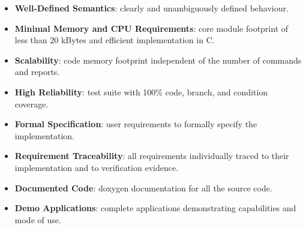 \begin{itemize}
\item{} \textbf{Well-{}Defined Semantics}: clearly and unambiguously defined behaviour.
\item{} \textbf{Minimal Memory and CPU Requirements}: core module footprint of less than 20 kBytes and efficient implementation in C.
\item{} \textbf{Scalability}: code memory footprint independent of the number of commands and reports.
\item{} \textbf{High Reliability}: test suite with 100\% code, branch, and condition coverage.
\item{} \textbf{Formal Specification}: user requirements to formally specify the implementation.
\item{} \textbf{Requirement Traceability}: all requirements individually traced to their implementation and to verification evidence.
\item{} \textbf{Documented Code}: doxygen documentation for all the source code.
\item \textbf{Demo Applications}: complete applications demonstrating capabilities and mode of use.
\end{itemize}

